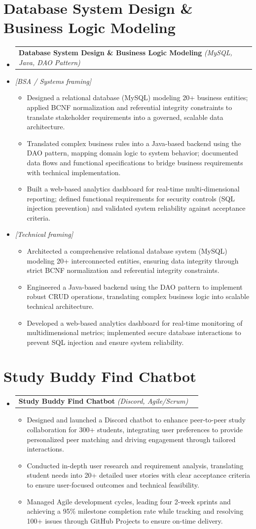 \documentclass[letterpaper,10pt]{article}
\makeatletter
\newcommand{\resumeItem}[1]{\item\small{{#1\vspace{-2pt}}}}
\newcommand{\resumeProjectHeading}[2]{
  \item\begin{tabular*}{0.97\textwidth}{l@{\extracolsep{\fill}}r}
    \small#1 & #2 \\
  \end{tabular*}\vspace{-7pt}}
\newcommand{\resumeNote}[1]{\item\small{\textit{[#1]}}\vspace{-4pt}}
\newcommand{\resumeSubHeadingListStart}{\begin{itemize}[leftmargin=0.15in,label={}]}
\newcommand{\resumeSubHeadingListEnd}{\end{itemize}}
\newcommand{\resumeItemListStart}{\begin{itemize}}
\newcommand{\resumeItemListEnd}{\end{itemize}\vspace{-5pt}}
\makeatother
\begin{document}
\section{Database System Design \& Business Logic Modeling}
\resumeSubHeadingListStart
  \resumeProjectHeading{\textbf{Database System Design \& Business Logic Modeling} \emph{(MySQL, Java, DAO Pattern)}}{}

  \resumeNote{BSA / Systems framing}
  \resumeItemListStart
    \resumeItem{Designed a relational database (MySQL) modeling 20+ business entities; applied BCNF normalization and referential integrity constraints to translate stakeholder requirements into a governed, scalable data architecture.}
    \resumeItem{Translated complex business rules into a Java-based backend using the DAO pattern, mapping domain logic to system behavior; documented data flows and functional specifications to bridge business requirements with technical implementation.}
    \resumeItem{Built a web-based analytics dashboard for real-time multi-dimensional reporting; defined functional requirements for security controls (SQL injection prevention) and validated system reliability against acceptance criteria.}
  \resumeItemListEnd

  \resumeNote{Technical framing}
  \resumeItemListStart
    \resumeItem{Architected a comprehensive relational database system (MySQL) modeling 20+ interconnected entities, ensuring data integrity through strict BCNF normalization and referential integrity constraints.}
    \resumeItem{Engineered a Java-based backend using the DAO pattern to implement robust CRUD operations, translating complex business logic into scalable technical architecture.}
    \resumeItem{Developed a web-based analytics dashboard for real-time monitoring of multidimensional metrics; implemented secure database interactions to prevent SQL injection and ensure system reliability.}
  \resumeItemListEnd
\resumeSubHeadingListEnd

\section{Study Buddy Find Chatbot}
\resumeSubHeadingListStart
  \resumeProjectHeading{\textbf{Study Buddy Find Chatbot} \emph{(Discord, Agile/Scrum)}}{}
  \resumeItemListStart
    \resumeItem{Designed and launched a Discord chatbot to enhance peer-to-peer study collaboration for 300+ students, integrating user preferences to provide personalized peer matching and driving engagement through tailored interactions.}
    \resumeItem{Conducted in-depth user research and requirement analysis, translating student needs into 20+ detailed user stories with clear acceptance criteria to ensure user-focused outcomes and technical feasibility.}
    \resumeItem{Managed Agile development cycles, leading four 2-week sprints and achieving a 95\% milestone completion rate while tracking and resolving 100+ issues through GitHub Projects to ensure on-time delivery.}
  \resumeItemListEnd
\resumeSubHeadingListEnd
\end{document}

